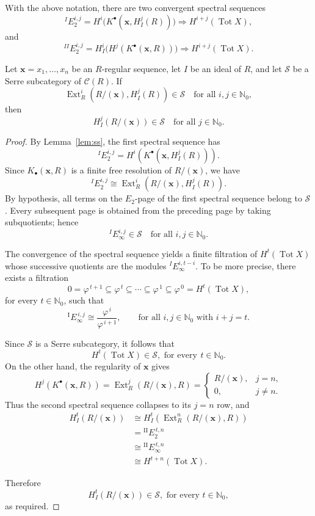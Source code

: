 \documentclass[10pt,a4paper]{amsart}
\newcommand{\Ext}{\operatorname{Ext}}
\newcommand{\NN}{\mathbb N_0}
\begin{document}
\begin{lemma}\label{lem:ss}
With the above notation, there are two convergent spectral sequences
\[
{}^IE_2^{i,j}
=
H^i\bigl(K^\bullet(\mathbf x,H_I^j(R))\bigr)
\Longrightarrow
H^{i+j}(\operatorname{Tot}X),
\]
and
\[
{}^{II}E_2^{i,j}
=
H_I^i\bigl(H^j(K^\bullet(\mathbf x,R))\bigr)
\Longrightarrow
H^{i+j}(\operatorname{Tot}X).
\]
\end{lemma}

\begin{theorem}\label{thm:main2}
Let $\mathbf x=x_1,\ldots,x_n$ be an $R$-regular sequence, let $I$ be
an ideal of $R$, and let $\mathcal S$ be a Serre subcategory of
$\mathcal C(R)$. If
\[
\Ext_R^i(R/(\mathbf x),H_I^j(R))\in\mathcal S
\quad\text{for all }i,j\in\NN,
\]
  then
\[
H_I^j(R/(\mathbf x))\in\mathcal S  \quad\text{for all } j\in\NN.
\]
\end{theorem}

\begin{proof}
By Lemma~\ref{lem:ss}, the first spectral sequence has
\[
{}^IE_2^{i,j}
=
H^i(K^\bullet(\mathbf x,H_I^j(R))).
\]
Since $K_\bullet(\mathbf x,R)$ is a finite free resolution of
$R/(\mathbf x)$, we have
\[
{}^IE_2^{i,j}
\cong
\Ext_R^i(R/(\mathbf x),H_I^j(R)).
\]
By hypothesis, all terms on the $E_2$-page of the first spectral
sequence belong to $\mathcal S$. Every subsequent page is obtained
from the preceding page by taking subquotients; hence
\[
{}^IE_\infty^{i,j}\in\mathcal S \quad\text{for all } i, j\in\NN.
\] 

The convergence of the spectral sequence yields a finite filtration
of $H^t(\operatorname{Tot}X)$ whose successive quotients are the
modules ${}^IE_\infty^{i,t-i}$. To be more precise, there exists a filtration
\[
0=\varphi^{\,t+1}
\subseteq
\varphi^{\,t}
\subseteq
\cdots
\subseteq
\varphi^{\,1}
\subseteq
\varphi^{\,0}
=
H^{t}(\operatorname{Tot}X),
\]
for every \(t\in\mathbb{N}_{0}\), such that
\[
{}^{\mathrm{I}}E_{\infty}^{\,i,j}
\cong
\frac{\varphi^{\,i}}{\varphi^{\,i+1}},
\qquad
\text{for all } i,j\in\mathbb{N}_{0}
\text{ with } i+j=t.
\]


Since $\mathcal S$ is a Serre
subcategory, it follows that
\[
H^t(\operatorname{Tot}X)\in\mathcal S,\,\,\text{for every}\,\ t\in \NN.
\]
On the other hand, the regularity of $\mathbf x$ gives
\[
H^j(K^\bullet(\mathbf x,R))
= \operatorname{Ext}_R^j(R/(\mathbf x), R)= 
\begin{cases}
R/(\mathbf x),&j= n,\\
0,&j\neq n.
\end{cases}
\]
Thus the second spectral sequence collapses to its $j= n$ row, and
\begin{align*}
        H_I^t(R/(\mathbf x))&\cong H_I^t(\operatorname{Ext}_R^n(R/(\mathbf x), R))\\
       &=  {}^{\mathrm{II}}E_{2}^{\,t,n}\\
       &\cong {}^{\mathrm{II}}E_{\infty}^{\,t,n} \\
     & \cong H^{t+ n}(\operatorname{Tot}X).
\end{align*}
 
Therefore
\[
H_I^t(R/(\mathbf x))\in\mathcal S,\,\,\text{for every}\,\,  t\in\NN,
\]
 as required.
\end{proof}
\end{document}
